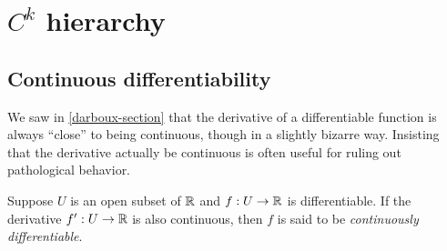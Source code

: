\section{\texorpdfstring{$C^k$}{Ck} hierarchy} 

\subsection{Continuous differentiability}

We saw in \cref{darboux-section} that the derivative of a differentiable function is always ``close'' to being continuous, though in a slightly bizarre way. Insisting that the derivative actually be continuous is often useful for ruling out pathological behavior. 

\begin{definition}
	Suppose $U$ is an open subset of $\mathbb{R}$ and $f : U \to \mathbb{R}$ is differentiable. If the derivative $f' : U \to \mathbb{R}$ is also continuous, then $f$ is said to be \emph{continuously differentiable}. 
\end{definition}

